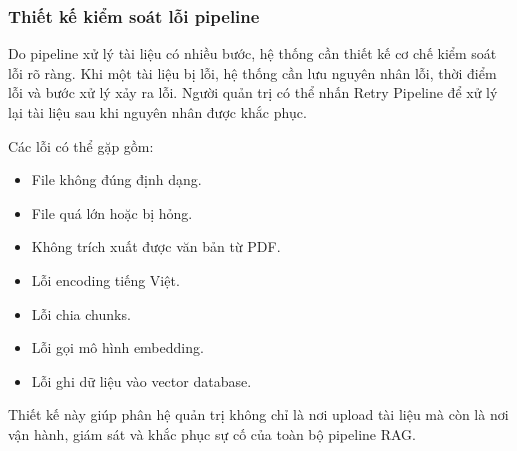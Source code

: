 \subsubsection{Thiết kế kiểm soát lỗi pipeline}

Do pipeline xử lý tài liệu có nhiều bước, hệ thống cần thiết kế cơ chế kiểm soát lỗi rõ ràng. Khi một tài liệu bị lỗi, hệ thống cần lưu nguyên nhân lỗi, thời điểm lỗi và bước xử lý xảy ra lỗi. Người quản trị có thể nhấn Retry Pipeline để xử lý lại tài liệu sau khi nguyên nhân được khắc phục.

Các lỗi có thể gặp gồm:

\begin{itemize}
    \item File không đúng định dạng.
    \item File quá lớn hoặc bị hỏng.
    \item Không trích xuất được văn bản từ PDF.
    \item Lỗi encoding tiếng Việt.
    \item Lỗi chia chunks.
    \item Lỗi gọi mô hình embedding.
    \item Lỗi ghi dữ liệu vào vector database.
\end{itemize}

Thiết kế này giúp phân hệ quản trị không chỉ là nơi upload tài liệu mà còn là nơi vận hành, giám sát và khắc phục sự cố của toàn bộ pipeline RAG.
